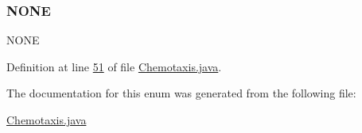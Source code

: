 \subsubsection{\texorpdfstring{N\+O\+NE}{NONE}}
{\footnotesize\ttfamily N\+O\+NE}



Definition at line \hyperlink{_chemotaxis_8java_source_l00051}{51} of file \hyperlink{_chemotaxis_8java_source}{Chemotaxis.\+java}.



The documentation for this enum was generated from the following file\+:\begin{DoxyCompactItemize}
\item 
\hyperlink{_chemotaxis_8java}{Chemotaxis.\+java}\end{DoxyCompactItemize}
